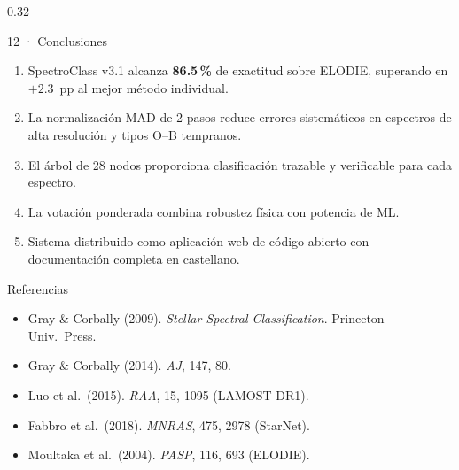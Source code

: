 \documentclass[final]{beamer}
\begin{document}
\begin{frame}[t]{}
\begin{columns}[t,totalwidth=\paperwidth]
\begin{column}{0.32\paperwidth}
  \begin{exampleblock}{12 · Conclusiones}
    \begin{enumerate}\setlength\itemsep{5pt}
      \item SpectroClass v3.1 alcanza \textbf{86.5\,\%} de exactitud sobre
            ELODIE, superando en $+2.3$~pp al mejor método individual.
      \item La normalización MAD de 2 pasos reduce errores sistemáticos en
            espectros de alta resolución y tipos O--B tempranos.
      \item El árbol de 28 nodos proporciona clasificación trazable y
            verificable para cada espectro.
      \item La votación ponderada combina robustez física con potencia de ML.
      \item Sistema distribuido como aplicación web de código abierto con
            documentación completa en castellano.
    \end{enumerate}
  \end{exampleblock}

  \vspace{0.5cm}

  \begin{block}{Referencias}
    \small
    \begin{itemize}\setlength\itemsep{2pt}
      \item Gray \& Corbally (2009). \textit{Stellar Spectral Classification}.
            Princeton Univ.\ Press.
      \item Gray \& Corbally (2014). \textit{AJ}, 147, 80.
      \item Luo et al.\ (2015). \textit{RAA}, 15, 1095 (LAMOST DR1).
      \item Fabbro et al.\ (2018). \textit{MNRAS}, 475, 2978 (StarNet).
      \item Moultaka et al.\ (2004). \textit{PASP}, 116, 693 (ELODIE).
    \end{itemize}
  \end{block}

\end{column}
\end{columns}

\vspace{0.4cm}


\end{frame}
\end{document}
